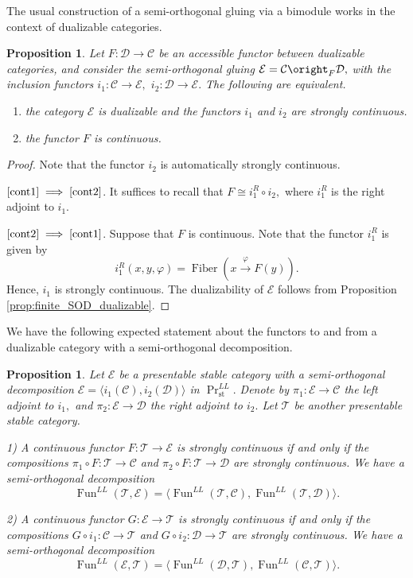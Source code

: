 \documentclass[11pt,leqno]{amsart}
\newcommand{\Implies}[2]{$\text{\ref{#1}}\implies\text{\ref{#2}}$}
\newtheorem{prop}[theo]{Proposition}
\numberwithin{equation}{section}
\newcommand{\xto}{\xrightarrow}
\newcommand{\Fiber}{\operatorname{Fiber}}
\newcommand{\st}{\operatorname{st}}
\newcommand{\cD}{{\mathcal D}}
\newcommand{\cC}{{\mathcal C}}
\newcommand{\cE}{{\mathcal E}}
\newcommand{\cT}{{\mathcal T}}
\newcommand{\la}{\langle}
\newcommand{\ra}{\rangle}
\newcommand{\Fun}{\operatorname{Fun}}
\begin{document}
The usual construction of a semi-orthogonal gluing via a bimodule works in the context of dualizable categories.

\begin{prop}\label{prop:gluing_of_dualizable} Let $F:\cD\to\cC$ be an accessible functor between dualizable categories, and consider the semi-orthogonal gluing $\cE=\cC\oright_F \cD,$ with the inclusion functors $i_1:\cC\to\cE,$ $i_2:\cD\to\cE.$ The following are equivalent.
\begin{enumerate}[label=(\roman*),ref=(\roman*)]
\item the category $\cE$ is dualizable and the functors $i_1$ and $i_2$ are strongly continuous. \label{cont1}

\item the functor $F$ is continuous. \label{cont2}
\end{enumerate}
\end{prop}


\begin{proof} Note that the functor $i_2$ is automatically strongly continuous. 

\Implies{cont1}{cont2}. It suffices to recall that $F\cong i_1^R\circ i_2,$ where $i_1^R$ is the right adjoint to $i_1.$

\Implies{cont2}{cont1}. Suppose that $F$ is continuous. Note that the functor $i_1^R$ is given by
$$i_1^R(x,y,\varphi)=\Fiber(x\xto{\varphi}F(y)).$$ Hence, $i_1$ is strongly continuous. The dualizability of $\cE$ follows from Proposition \ref{prop:finite_SOD_dualizable}.\end{proof}

We have the following expected statement about the functors to and from a dualizable category with a semi-orthogonal decomposition.

\begin{prop}\label{prop:functors_in_and_out_SOD} Let $\cE$ be a presentable stable category with a semi-orthogonal decomposition $\cE=\la i_1(\cC), i_2(\cD)\ra$ in $\Pr_{\st}^{LL}.$ Denote by $\pi_1:\cE\to\cC$ the left adjoint to $i_1,$ and $\pi_2:\cE\to\cD$ the right adjoint to $i_2.$ Let $\cT$ be another presentable stable category.

1) A continuous functor $F:\cT\to\cE$ is strongly continuous if and only if the compositions $\pi_1\circ F:\cT\to\cC$ and $\pi_2\circ F:\cT\to\cD$ are strongly continuous. We have a semi-orthogonal decomposition
$$\Fun^{LL}(\cT,\cE)=\la \Fun^{LL}(\cT,\cC), \Fun^{LL}(\cT,\cD)\ra.$$

2) A continuous functor $G:\cE\to\cT$ is strongly continuous if and only if the compositions $G\circ i_1:\cC\to\cT$ and $G\circ i_2:\cD\to\cT$ are strongly continuous. We have a semi-orthogonal decomposition
$$\Fun^{LL}(\cE,\cT)=\la \Fun^{LL}(\cD,\cT), \Fun^{LL}(\cC,\cT)\ra.$$ \end{prop}
\end{document}
